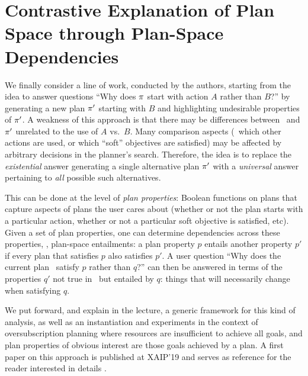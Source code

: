 \section{Contrastive Explanation of Plan Space through Plan-Space Dependencies}
\label{xpp}

We finally consider a line of work, conducted by the authors, starting
from the idea to answer questions ``Why does $\pi$ start with action
$A$ rather than $B$?'' by generating a new plan $\pi'$ starting with
$B$ and highlighting undesirable properties of $\pi'$. A 
weakness of this approach is that there may be differences between
\plan\ and $\pi'$ unrelated to the use of $A$ vs.\ $B$. Many
comparison aspects (\eg\ which other actions are used, or which
``soft'' objectives are satisfied) may be affected by arbitrary
decisions in the planner's search. Therefore, the idea is to replace
the \emph{existential} answer generating a single alternative plan
$\pi'$ with a \emph{universal} answer pertaining to \emph{all}
possible such alternatives.

This can be done at the level of \emph{plan properties}: Boolean
functions on plans that capture aspects of plans the user cares about
(whether or not the plan starts with a particular action, whether or
not a particular soft objective is satisfied, etc). Given a set of
plan properties, one can determine dependencies across these
properties, \ie, plan-space entailments: a plan property $p$ entails
another property $p'$ if every plan that satisfies $p$ also satisfies
$p'$. A user question ``Why does the current plan \plan\ satisfy $p$
rather than $q$?'' can then be answered in terms of the properties
$q'$ not true in \plan\ but entailed by $q$: things that will
necessarily change when satisfying $q$.

We put forward, and explain in the lecture, a generic framework for
this kind of analysis, as well as an instantiation and experiments in
the context of oversubscription planning
\cite{smith:icaps-04,domshlak:mirkis:jair-15} where resources are
insufficient to achieve all goals, and plan properties of obvious
interest are those goals achieved by a plan. A first paper on this
approach is published at XAIP'19 and serves as reference for the
reader interested in details \cite{eifler:etal:xaip-19}.
